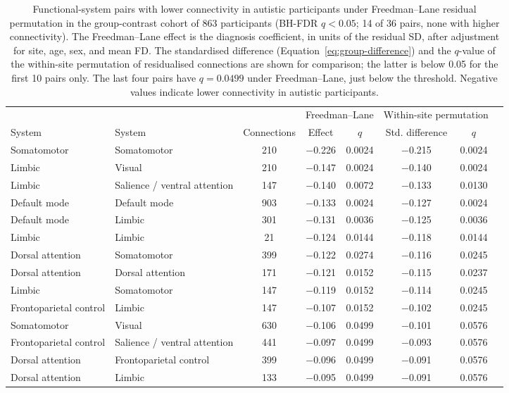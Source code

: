 \begin{table}[t]
\centering
\caption{Functional-system pairs with lower connectivity in autistic participants under Freedman--Lane residual permutation in the group-contrast cohort of 863 participants (BH-FDR $q<0.05$; 14 of 36 pairs, none with higher connectivity). The Freedman--Lane effect is the diagnosis coefficient, in units of the residual SD, after adjustment for site, age, sex, and mean FD. The standardised difference (Equation~\eqref{eq:group-difference}) and the $q$-value of the within-site permutation of residualised connections are shown for comparison; the latter is below 0.05 for the first 10 pairs only. The last four pairs have $q=0.0499$ under Freedman--Lane, just below the threshold. Negative values indicate lower connectivity in autistic participants.}
\label{tab:system-pairs}
\footnotesize
\setlength{\tabcolsep}{3pt}
\begin{tabular}{@{}llcccccc@{}}
\toprule
 & & & \multicolumn{2}{c}{Freedman--Lane} & \multicolumn{2}{c}{Within-site permutation} \\
\cmidrule(lr){4-5}\cmidrule(l){6-7}
System & System & Connections & Effect & $q$ & Std. difference & $q$ \\
\midrule
Somatomotor & Somatomotor & 210 & $-$0.226 & 0.0024 & $-$0.215 & 0.0024 \\
Limbic & Visual & 210 & $-$0.147 & 0.0024 & $-$0.140 & 0.0024 \\
Limbic & Salience / ventral attention & 147 & $-$0.140 & 0.0072 & $-$0.133 & 0.0130 \\
Default mode & Default mode & 903 & $-$0.133 & 0.0024 & $-$0.127 & 0.0024 \\
Default mode & Limbic & 301 & $-$0.131 & 0.0036 & $-$0.125 & 0.0036 \\
Limbic & Limbic & 21 & $-$0.124 & 0.0144 & $-$0.118 & 0.0144 \\
Dorsal attention & Somatomotor & 399 & $-$0.122 & 0.0274 & $-$0.116 & 0.0245 \\
Dorsal attention & Dorsal attention & 171 & $-$0.121 & 0.0152 & $-$0.115 & 0.0237 \\
Limbic & Somatomotor & 147 & $-$0.119 & 0.0152 & $-$0.114 & 0.0245 \\
Frontoparietal control & Limbic & 147 & $-$0.107 & 0.0152 & $-$0.102 & 0.0245 \\
Somatomotor & Visual & 630 & $-$0.106 & 0.0499 & $-$0.101 & 0.0576 \\
Frontoparietal control & Salience / ventral attention & 441 & $-$0.097 & 0.0499 & $-$0.093 & 0.0576 \\
Dorsal attention & Frontoparietal control & 399 & $-$0.096 & 0.0499 & $-$0.091 & 0.0576 \\
Dorsal attention & Limbic & 133 & $-$0.095 & 0.0499 & $-$0.091 & 0.0576 \\
\bottomrule
\end{tabular}
\end{table}

